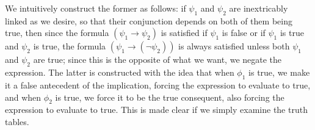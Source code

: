 \documentclass{article}
\begin{document}
We intuitively construct the former as follows: if $ \psi_1 $ and $ \psi_2 $ are inextricably linked as we desire, so that their conjunction depends on both of them being true, then since the formula $ (\psi_1 \rightarrow \psi_2) $ is satisfied if $ \psi_1 $ is false or if $ \psi_1 $ is true and $ \psi_2 $ is true, the formula $ (\psi_1 \rightarrow (\neg \psi_2)) $ is always satisfied unless both $ \psi_1 $ and $ \psi_2 $ are true; since this is the opposite of what we want, we negate the expression. The latter is constructed with the idea that when $ \phi_1 $ is true, we make it a false antecedent of the implication, forcing the expression to evaluate to true, and when $ \phi_2 $ is true, we force it to be the true consequent, also forcing the expression to evaluate to true. This is made clear if we simply examine the truth tables.
\end{document}
